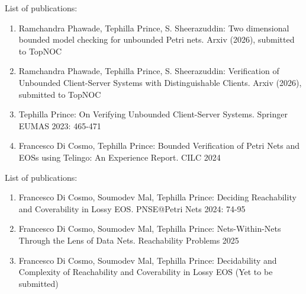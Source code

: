 \documentclass [serif,professionalfont]{beamer}
\begin{document}
\begin{frame}{List of publications:}
    \begin{enumerate}
        \item[1] Ramchandra Phawade, Tephilla Prince, S. Sheerazuddin:
            Two dimensional bounded model checking for unbounded Petri nets. Arxiv (2026),  submitted to TopNOC
        \item[2] Ramchandra Phawade, Tephilla Prince, S. Sheerazuddin: Verification of Unbounded Client-Server Systems with Distinguishable Clients. Arxiv (2026), submitted to TopNOC
        \item[3]   Tephilla Prince:
            On Verifying Unbounded Client-Server Systems. Springer EUMAS 2023: 465-471
        \item[4]   Francesco Di Cosmo, Tephilla Prince:
            Bounded Verification of Petri Nets and EOSs using Telingo: An Experience Report. CILC 2024


    \end{enumerate}
\end{frame}

\begin{frame}{List of publications:}
    \begin{enumerate}

        \item[5]   Francesco Di Cosmo, Soumodev Mal, Tephilla Prince:
            Deciding Reachability and Coverability in Lossy EOS. PNSE@Petri Nets 2024: 74-95

        \item[6]  Francesco Di Cosmo, Soumodev Mal, Tephilla Prince: Nets-Within-Nets Through the Lens of Data Nets. Reachability Problems 2025
        \item[7] Francesco Di Cosmo, Soumodev Mal, Tephilla Prince: Decidability and Complexity of Reachability and Coverability in Lossy EOS (Yet to be submitted)





    \end{enumerate}
\end{frame}
\end{document}
